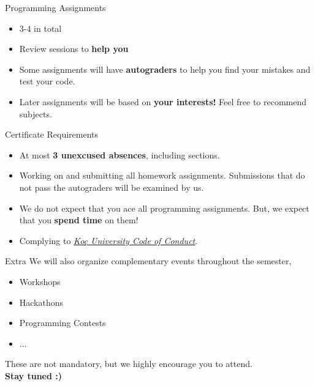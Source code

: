 		\begin{frame}{Programming Assignments}
			\pause
			\begin{itemize}
				\LARGE
				\item 3-4 in total
				\pause
				\item Review sessions to \textbf{help you}
				\pause
				\item Some assignments will have \textbf{autograders} to help you find your mistakes and test your code.
				\pause
				\item Later assignments will be based on \textbf{your interests!} Feel free to recommend subjects.
			\end{itemize}
		\end{frame}

		\begin{frame}{Certificate Requirements}
			\pause
			\begin{itemize}
				\LARGE
				\item At most \textbf{3 unexcused absences}, including sections.
				\pause
				\item Working on and submitting all homework assignments. Submissions that do not pass the autograders will be examined by us.
				\pause
				\item We do not expect that you ace all programming assignments. But, we expect that you \textbf{spend time} on them!
				\pause
				\item Complying to \href{https://vpaa.ku.edu.tr/academic/student-code-of-conduct}{\underline{\textit{Koç University Code of Conduct}}}. 
			\end{itemize}
		\end{frame}

		
		\begin{frame}{Extra}
			\LARGE
			We will also organize complementary events throughout the semester,
			\begin{itemize}
				\item Workshops
				\item Hackathons
				\item Programming Contests
				\item $\dots$ 
			\end{itemize}
			These are not mandatory, but we highly encourage you to attend.\\
			\huge
			\textbf{Stay tuned :)}

		\end{frame}

